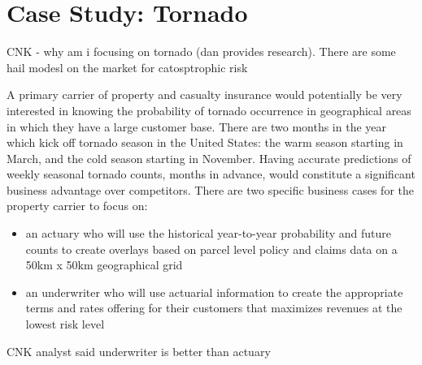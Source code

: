 

\section*{Case Study: Tornado}

CNK - why am i focusing on tornado (dan provides research). There are some hail modesl on the market for catosptrophic risk 

A primary carrier of property and casualty insurance would potentially be very interested in knowing the probability of tornado occurrence in geographical areas in which they have a large customer base. There are two months in the year which kick off tornado season in the United States: the warm season starting in March, and the cold season starting in November. Having accurate predictions of weekly seasonal tornado counts, months in advance, would constitute a significant business advantage over competitors. There are two specific business cases for the property carrier to focus on:
\begin{itemize}
    \item an actuary who will use the historical year-to-year probability and future counts to create overlays based on parcel level policy and claims data on a 50km x 50km geographical grid
    \item an underwriter who will use actuarial information to create the appropriate terms and rates offering for their customers that maximizes revenues at the lowest risk level
\end{itemize}

CNK analyst said underwriter is better than actuary

